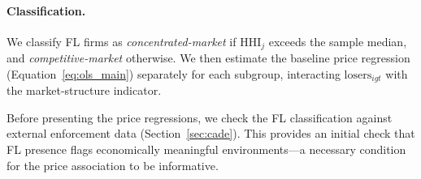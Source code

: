 \paragraph{Classification.}
We classify FL firms as \emph{concentrated-market} if
$\text{HHI}_j$ exceeds the sample median, and
\emph{competitive-market} otherwise. We then estimate the baseline
price regression (Equation~\ref{eq:ols_main}) separately for each
subgroup, interacting $\text{losers}_{igt}$ with the
market-structure indicator.

Before presenting the price regressions, we check the FL
classification against external enforcement data
(Section~\ref{sec:cade}). This provides an initial check that FL presence flags
economically meaningful environments---a necessary condition for the
price association to be informative.
